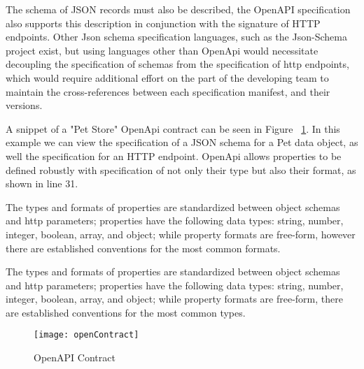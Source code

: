 The schema of JSON records must also be described,
the OpenAPI specification also supports this description
in conjunction with the signature of HTTP endpoints.
Other Json schema specification languages, such as the Json-Schema project
exist, but using languages other than OpenApi would necessitate decoupling the specification of schemas from the specification
of http endpoints, which would require additional effort on the part of the developing team to maintain the cross-references
between each specification manifest, and their versions.

A snippet of a "Pet Store" OpenApi contract can be seen in Figure ~\ref{fig:open_contract}.
In this example we can view the specification of a JSON schema for a Pet data object,
as well the specification for an HTTP endpoint.
OpenApi allows properties to be defined robustly with specification of not only their type but also their format, as shown in line 31.

The types and formats of properties are standardized between object schemas and http parameters;
properties have the following data types: string, number, integer, boolean, array, and object;
while property formats are free-form, however there are established conventions for the most common formats.

The types and formats of properties are standardized between object schemas and http parameters;
properties have the following data types: string, number, integer, boolean, array, and object;
while property formats are free-form, there are established conventions for the most common types.

\begin{figure}[htbp]
    \centering
    \texttt{[image: openContract]}
    \caption{OpenAPI Contract}
    \label{fig:open_contract}
\end{figure}

